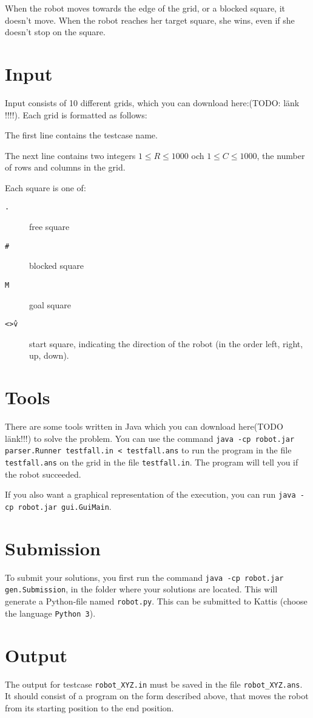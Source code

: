 When the robot moves towards the edge of the grid, or a blocked square, it doesn't move. When the robot reaches her target square, she wins, even if she doesn't stop on the square.

\section*{Input}
Input consists of 10 different grids, which you can download here:(TODO: länk !!!!). Each grid is formatted as follows:

The first line contains the testcase name.

The next line contains two integers $1 \le R \le 1000$ och $1 \le C \le 1000$, the number of rows and columns in the grid.

Each square is one of:
\begin{description}
  \item[\texttt{.}] free square
  \item[\texttt{\#}] blocked square
  \item[\texttt{M}] goal square
  \item[\texttt{<>\^v}] start square, indicating the direction of the robot (in the order left, right, up, down).
\end{description}

\section*{Tools}
There are some tools written in Java which you can download here(TODO länk!!!) to solve the problem. You can use the command \texttt{java -cp robot.jar parser.Runner testfall.in < testfall.ans} 
to run the program in the file \texttt{testfall.ans} on the grid in the file \texttt{testfall.in}. The program will tell you if the robot succeeded.

If you also want a graphical representation of the execution, you can run \texttt{java -cp robot.jar gui.GuiMain}.

\section*{Submission}
To submit your solutions, you first run the command \texttt{java -cp robot.jar gen.Submission}, in the folder where your solutions are located. This will generate a Python-file named \texttt{robot.py}.
This can be submitted to Kattis (choose the language \texttt{Python 3}).

\section*{Output}
The output for testcase \texttt{robot\_XYZ.in} must be saved in the file \texttt{robot\_XYZ.ans}. It should consist of a program on the form described above, that moves the robot from its starting position to the end position.

